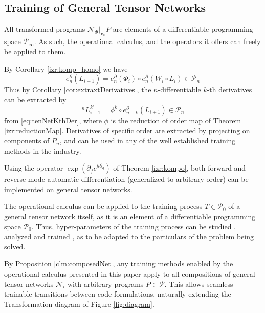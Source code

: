 \documentclass[11pt]{article}
\newcommand{\NN}{\mathcal{N}}
\newcommand{\vv}{\mathbf{v}}
\newcommand{\dP}{\mathcal{P}}
\newcommand{\D}{\partial}
\begin{document}
\subsection{Training of General Tensor Networks}\label{sec:trainNet}

All transformed programs $\NN_\Phi \vert_{\vv_0}P$ are elements of a differentiable programming space $\dP_\infty$. As such, the operational calculus, and the operators it offers can freely be applied to them.

By Corollary \ref{izr:komp_homo} we have
\begin{equation}\label{eq:tenNetKthDer}
e^\D_n(L_{i+1})=e^\D_n(\Phi_i)\circ e^\D_n(W_i\circ L_i)\in\dP_n
\end{equation}
Thus by Corollary \ref{cor:extraxtDerivatives}, the $n$-differentiable $k$-th derivatives can be extracted by
\begin{equation*}
^{n}L_{i+1}^{k\prime}=\phi^k\circ e^\D_{n+k}(L_{i+1})\in\dP_n
\end{equation*}
from \eqref{eq:tenNetKthDer}, where $\phi$ is the reduction of order map of
Theorem \ref{izr:reductionMap}. Derivatives of specific order are extracted by
projecting on components of $P_n$, and can be used in any of the well established training methods in the industry. 

\begin{proposition}
Using the operator $\exp(\D_fe^{h\D_g})$ of Theorem \ref{izr:kompo}, both forward and reverse mode automatic differentiation (generalized to arbitrary order) can be implemented on general tensor networks.
\end{proposition}

\begin{remark}
The operational calculus can be applied to the training process $T\in\dP_0$ of a
general tensor network itself, as it is an element of a differentiable
programming space $\dP_0$. Thus, hyper-parameters of the training process can be
studied \citep[e.g.,][]{HyperParams}, analyzed and trained \citep[e.g.,][]{hyper}, as to be adapted to the particulars of the problem being solved.
\end{remark}

By Proposition \ref{clm:composedNet}, any training methods enabled by the operational calculus presented in this paper apply to all compositions of general tensor networks $\NN_i$ with arbitrary programs $P\in\dP$. This allows seamless trainable transitions between code formulations, naturally extending the Transformation diagram of Figure \ref{fig:diagram}. 
  
\end{document}
